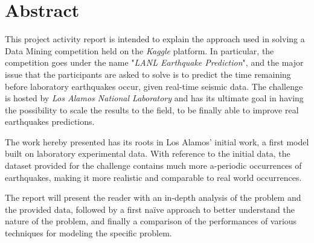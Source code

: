 \chapter*{Abstract}

\noindent This project activity report is intended to explain the approach used in solving a Data Mining competition held on the \textit{Kaggle} platform. In particular, the competition goes under the name "\textit{LANL Earthquake Prediction}", and the major issue that the participants are asked to solve is to predict the time remaining before laboratory earthquakes occur, given real-time seismic data. The challenge is hosted by \textit{Los Alamos National Laboratory} and has its ultimate goal in having the possibility to scale the results to the field, to be finally able to improve real earthquakes predictions.

The work hereby presented has its roots in Los Alamos' initial work, a first model built on laboratory experimental data. With reference to the initial data, the dataset provided for the challenge contains much more a-periodic occurrences of earthquakes, making it more realistic and comparable to real world occurrences.

The report will present the reader with an in-depth analysis of the problem and the provided data, followed by a first na{\"i}ve approach to better understand the nature of the problem, and finally a comparison of the performances of various techniques for modeling the specific problem.